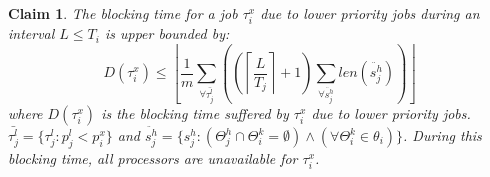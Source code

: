 \documentclass[twocolumn]{article}
\newtheorem{clm}{Claim}
\begin{document}
\begin{clm}\label{delay}
The blocking time for a job $\tau_{i}^{x}$ due to lower priority jobs 
during an interval $L\le T_{i}$ is upper bounded by:
\begin{equation}
D(\tau_{i}^{x})\le\left\lfloor \frac{1}{m}\sum_{\forall\bar{\tau_{j}^{l}}}\left(\left(\left\lceil \frac{L}{T_{j}}\right\rceil +1\right)\sum_{\forall\ddot{s_{j}^{h}}}len\left(\ddot{s_{j}^{h}}\right)\right)\right\rfloor \label{PNF-delay}
\end{equation}
where $D(\tau_{i}^{x})$ is the blocking time 
suffered by $\tau_{i}^{x}$
due to lower priority jobs. $\bar{\tau_{j}^{l}}=\{\tau_{j}^{l}:p_{j}^{l}<p_{i}^{x}\}$
and $\ddot{s_{j}^{h}}=\{s_{j}^{h}:\left(\Theta_{j}^{h} \cap \Theta_i^k = \emptyset \right) \wedge \left(\forall \Theta_i^k \in \theta_i \right)\}$. During this blocking time, all processors are unavailable for $\tau_{i}^{x}$.

\end{clm}
\end{document}
